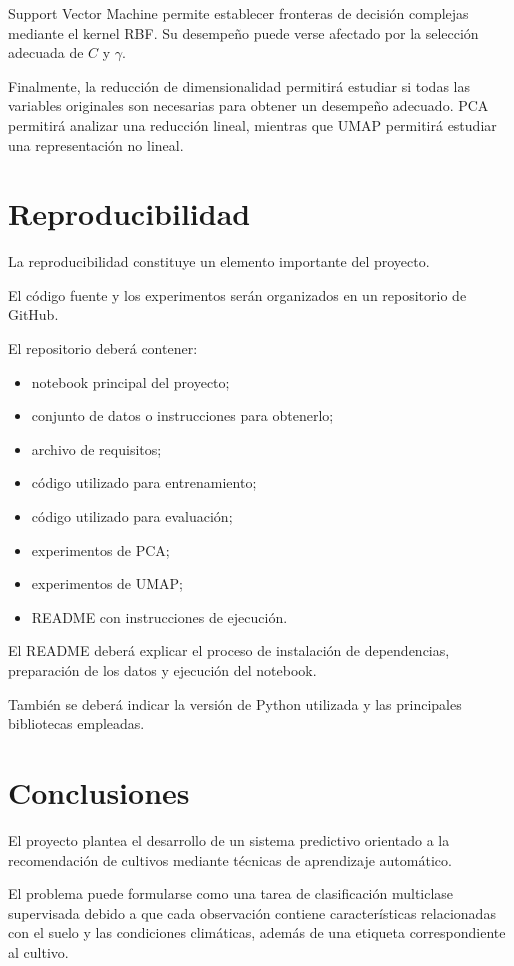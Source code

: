 \documentclass[conference]{IEEEtran}
\begin{document}
Support Vector Machine permite establecer fronteras de decisión complejas mediante el kernel RBF. Su desempeño puede verse afectado por la selección adecuada de $C$ y $\gamma$.

Finalmente, la reducción de dimensionalidad permitirá estudiar si todas las variables originales son necesarias para obtener un desempeño adecuado. PCA permitirá analizar una reducción lineal, mientras que UMAP permitirá estudiar una representación no lineal.


\section{Reproducibilidad}

La reproducibilidad constituye un elemento importante del proyecto.

El código fuente y los experimentos serán organizados en un repositorio de GitHub.

El repositorio deberá contener:

\begin{itemize}
    \item notebook principal del proyecto;
    \item conjunto de datos o instrucciones para obtenerlo;
    \item archivo de requisitos;
    \item código utilizado para entrenamiento;
    \item código utilizado para evaluación;
    \item experimentos de PCA;
    \item experimentos de UMAP;
    \item README con instrucciones de ejecución.
\end{itemize}

El README deberá explicar el proceso de instalación de dependencias, preparación de los datos y ejecución del notebook.

También se deberá indicar la versión de Python utilizada y las principales bibliotecas empleadas.


\section{Conclusiones}

El proyecto plantea el desarrollo de un sistema predictivo orientado a la recomendación de cultivos mediante técnicas de aprendizaje automático.

El problema puede formularse como una tarea de clasificación multiclase supervisada debido a que cada observación contiene características relacionadas con el suelo y las condiciones climáticas, además de una etiqueta correspondiente al cultivo.
\end{document}
